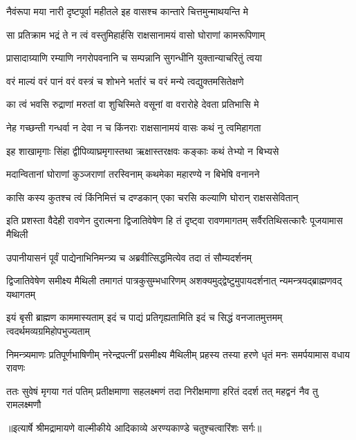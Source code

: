\twolineshloka
{नैवंरूपा मया नारी दृष्टपूर्वा महीतले}
{इह वासश्च कान्तारे चित्तमुन्माथयन्ति मे} %

\twolineshloka
{सा प्रतिक्राम भद्रं ते न त्वं वस्तुमिहार्हसि}
{राक्षसानामयं वासो घोराणां कामरूपिणाम्} %

\twolineshloka
{प्रासादाग्र्याणि रम्याणि नगरोपवनानि च}
{सम्पन्नानि सुगन्धीनि युक्तान्याचरितुं त्वया} %

\twolineshloka
{वरं माल्यं वरं पानं वरं वस्त्रं च शोभने}
{भर्तारं च वरं मन्ये त्वद्युक्तमसितेक्षणे} %

\twolineshloka
{का त्वं भवसि रुद्राणां मरुतां वा शुचिस्मिते}
{वसूनां वा वरारोहे देवता प्रतिभासि मे} %

\twolineshloka
{नेह गच्छन्ती गन्धर्वा न देवा न च किंनराः}
{राक्षसानामयं वासः कथं नु त्वमिहागता} %

\twolineshloka
{इह शाखामृगाः सिंहा द्वीपिव्याघ्रमृगास्तथा}
{ऋक्षास्तरक्षवः कङ्काः कथं तेभ्यो न बिभ्यसे} %

\twolineshloka
{मदान्वितानां घोराणां कुञ्जराणां तरस्विनाम्}
{कथमेका महारण्ये न बिभेषि वनानने} %

\twolineshloka
{कासि कस्य कुतश्च त्वं किंनिमित्तं च दण्डकान्}
{एका चरसि कल्याणि घोरान् राक्षससेवितान्} %

\threelineshloka
{इति प्रशस्ता वैदेही रावणेन दुरात्मना}
{द्विजातिवेषेण हि तं दृष्ट्वा रावणमागतम्}
{सर्वैरतिथिसत्कारैः पूजयामास मैथिली} %

\twolineshloka
{उपानीयासनं पूर्वं पाद्येनाभिनिमन्त्र्य च}
{अब्रवीत्सिद्धमित्येव तदा तं सौम्यदर्शनम्} %

\fourlineindentedshloka
{द्विजातिवेषेण समीक्ष्य मैथिली}
{तमागतं पात्रकुसुम्भधारिणम्}
{अशक्यमुद्द्वेष्टुमुपायदर्शनात्}
{न्यमन्त्रयद्ब्राह्मणवद् यथागतम्} %

\fourlineindentedshloka
{इयं बृसी ब्राह्मण काममास्यताम्}
{इदं च पाद्यं प्रतिगृह्यतामिति}
{इदं च सिद्धं वनजातमुत्तमम्}
{त्वदर्थमव्यग्रमिहोपभुज्यताम्} %

\fourlineindentedshloka
{निमन्त्र्यमाणः प्रतिपूर्णभाषिणीम्}
{नरेन्द्रपत्नीं प्रसमीक्ष्य मैथिलीम्}
{प्रहस्य तस्या हरणे धृतं मनः}
{समर्पयामास वधाय रावणः} %

\fourlineindentedshloka
{ततः सुवेषं मृगया गतं पतिम्}
{प्रतीक्षमाणा सहलक्ष्मणं तदा}
{निरीक्षमाणा हरितं ददर्श तत्}
{महद्वनं नैव तु रामलक्ष्मणौ} %


{॥इत्यार्षे श्रीमद्रामायणे वाल्मीकीये आदिकाव्ये अरण्यकाण्डे चतुश्चत्वारिंशः सर्गः॥}

